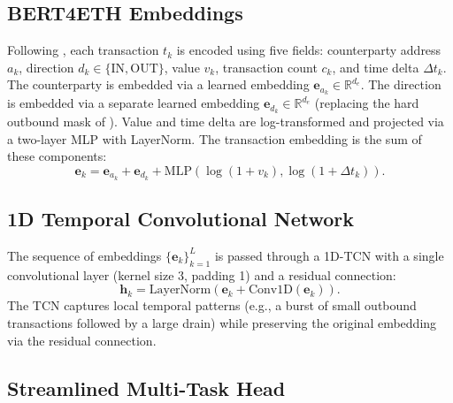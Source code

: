 \documentclass[conference]{IEEEtran}
\begin{document}
\subsection{BERT4ETH Embeddings}
Following \cite{bert4eth}, each transaction $t_k$ is encoded using five fields: counterparty address $a_k$, direction $d_k \in \{\text{IN}, \text{OUT}\}$, value $v_k$, transaction count $c_k$, and time delta $\Delta t_k$. The counterparty is embedded via a learned embedding $\mathbf{e}_{a_k} \in \mathbb{R}^{d_e}$. The direction is embedded via a separate learned embedding $\mathbf{e}_{d_k} \in \mathbb{R}^{d_e}$ (replacing the hard outbound mask of \cite{bert4eth}). Value and time delta are log-transformed and projected via a two-layer MLP with LayerNorm. The transaction embedding is the sum of these components:
\begin{equation}
\mathbf{e}_k = \mathbf{e}_{a_k} + \mathbf{e}_{d_k} + \text{MLP}(\log(1 + v_k), \log(1 + \Delta t_k)).
\end{equation}

\subsection{1D Temporal Convolutional Network}
The sequence of embeddings $\{\mathbf{e}_k\}_{k=1}^L$ is passed through a 1D-TCN with a single convolutional layer (kernel size 3, padding 1) and a residual connection:
\begin{equation}
\mathbf{h}_k = \text{LayerNorm}(\mathbf{e}_k + \text{Conv1D}(\mathbf{e}_k)).
\end{equation}
The TCN captures local temporal patterns (e.g., a burst of small outbound transactions followed by a large drain) while preserving the original embedding via the residual connection.

\subsection{Streamlined Multi-Task Head}
\end{document}
